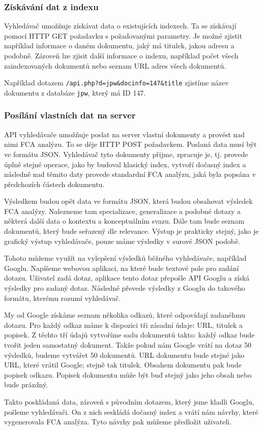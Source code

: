\documentclass[12pt]{article}
\newcommand{\code}[1]{\texttt{#1}}
\newcommand{\sssection}[1]{\subsubsection{#1}}
\begin{document}
\sssection{Získávání dat z indexu}

Vyhledávač umožňuje získávat data o existujících indexech. Ta se získávají pomocí HTTP GET požadavku s požadovanými parametry. Je možné zjistit například informace o daném dokumentu, jaký má titulek, jakou adresu a podobně. Zároveň lze zjisit další informace o indexu, například počet všech zaindexovaných dokumentů nebo seznam URL adres všech dokumentů.

Například dotazem \code{/api.php?d=jpw\&docinfo=147\&title} zjistíme název dokumentu z databáze \code{jpw}, který má ID 147.

\sssection{Posílání vlastních dat na server}
API vyhledávače umožňuje poslat na server vlastní dokumenty a provést nad nimi FCA analýzu. To se děje HTTP POST požadavkem. Poslaná data musí být ve formátu JSON. Vyhledávač tyto dokumenty přijme, zpracuje je, tj. provede úplně stejné operace, jako by budoval klasický index, vytvoří dočasný index a následně nad těmito daty provede standardní FCA analýzu, jaká byla popsána v předchozích částech dokumentu. 

Výsledkem budou opět data ve formátu JSON, která budou obsahovat výsledek FCA analýzy. Nalezneme tam specializace, generalizace a podobné dotazy a některá další data o kontextu a konceptuálním svazu. Dále tam bude seznam dokumentů, který bude seřazený dle relevance. Výstup je prakticky stejný, jako je grafický výstup vyhledávače, pouze máme výsledky v surové JSON podobě. 

Tohoto můžeme využít na vylepšení výsledků běžného vyhledávače, například Googlu. Napíšeme webovou aplikaci, na které bude textové pole pro zadání dotazu. Uživatel zadá dotaz, aplikace tento dotaz přepošle API Googlu a získá výsledky pro zadaný dotaz. Následně převede výsledky z Googlu do takového formátu, kterému rozumí vyhledávač.

My od Google získáme seznam několika odkazů, které odpovídají zadanéhmu dotazu. Pro každý odkaz máme k dispozici tři zásadní údaje: URL, titulek a popisek. Z těchto tří údajů vytvoříme sadu dokumentů takto: každý odkaz bude tvořit jeden samostatný dokument. Takže pokud nám Google vrátí na dotaz 50 výsledků, budeme vytvářet 50 dokumentů. URL dokumentu bude stejné jako URL, které vrátil Google; stejně tak titulek. Obsahem dokumentu pak bude popisek odkazu. Popisek dokumentu může být buď stejný jako jeho obsah nebo bude prázdný.

Takto poskládaná data, zároveň s původním dotazem, který jsme kladli Googlu, pošleme vyhledávači. On z nich seskládá dočasný index a vrátí nám návrhy, které vygenerovala FCA analýza. Tyto návrhy pak můžeme předložit uživateli. 
\end{document}
